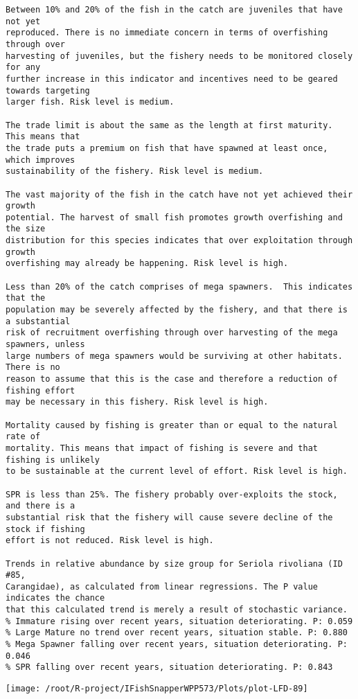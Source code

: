 \documentclass{report}\usepackage[]{graphicx}\usepackage[]{color}
\makeatletter
\def\maxwidth{ %
  \ifdim\Gin@nat@width>\linewidth
    \linewidth
  \else
    \Gin@nat@width
  \fi
}
\newenvironment{kframe}{%
 \def\at@end@of@kframe{}%
 \ifinner\ifhmode%
  \def\at@end@of@kframe{\end{minipage}}%
  \begin{minipage}{\columnwidth}%
 \fi\fi%
 \def\FrameCommand##1{\hskip\@totalleftmargin \hskip-\fboxsep
 \colorbox{shadecolor}{##1}\hskip-\fboxsep
     \hskip-\linewidth \hskip-\@totalleftmargin \hskip\columnwidth}%
 \MakeFramed {\advance\hsize-\width
   \@totalleftmargin\z@ \linewidth\hsize
   \@setminipage}}%
 {\par\unskip\endMakeFramed%
 \at@end@of@kframe}
\newenvironment{knitrout}{}{} %
\makeatother
\begin{document}
\begin{knitrout}
\begin{kframe}
\begin{verbatim}
Between 10% and 20% of the fish in the catch are juveniles that have not yet
reproduced. There is no immediate concern in terms of overfishing through over
harvesting of juveniles, but the fishery needs to be monitored closely for any
further increase in this indicator and incentives need to be geared towards targeting
larger fish. Risk level is medium.

The trade limit is about the same as the length at first maturity.  This means that
the trade puts a premium on fish that have spawned at least once, which improves
sustainability of the fishery. Risk level is medium.

The vast majority of the fish in the catch have not yet achieved their growth
potential. The harvest of small fish promotes growth overfishing and the size
distribution for this species indicates that over exploitation through growth
overfishing may already be happening. Risk level is high.

Less than 20% of the catch comprises of mega spawners.  This indicates that the
population may be severely affected by the fishery, and that there is a substantial
risk of recruitment overfishing through over harvesting of the mega spawners, unless
large numbers of mega spawners would be surviving at other habitats. There is no
reason to assume that this is the case and therefore a reduction of fishing effort
may be necessary in this fishery. Risk level is high.
 
Mortality caused by fishing is greater than or equal to the natural rate of
mortality. This means that impact of fishing is severe and that fishing is unlikely
to be sustainable at the current level of effort. Risk level is high.
 
SPR is less than 25%. The fishery probably over-exploits the stock, and there is a
substantial risk that the fishery will cause severe decline of the stock if fishing
effort is not reduced. Risk level is high.
 
Trends in relative abundance by size group for Seriola rivoliana (ID #85,
Carangidae), as calculated from linear regressions. The P value indicates the chance
that this calculated trend is merely a result of stochastic variance.
% Immature rising over recent years, situation deteriorating. P: 0.059
% Large Mature no trend over recent years, situation stable. P: 0.880
% Mega Spawner falling over recent years, situation deteriorating. P: 0.046
% SPR falling over recent years, situation deteriorating. P: 0.843
\end{verbatim}
\end{kframe}
\texttt{[image: /root/R-project/IFishSnapperWPP573/Plots/plot-LFD-89]} 


\end{knitrout}
\end{document}

